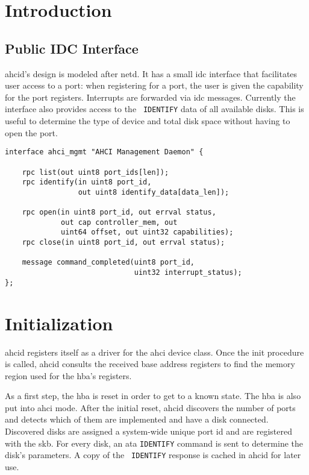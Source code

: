 \label{chap:ahcid}

\section{Introduction}

\subsection{Public IDC Interface}

ahcid's design is modeled after netd. It has a small \acs{idc} interface that
facilitates user access to a port: when registering for a port, the user is
given the capability for the port registers. Interrupts are forwarded via
\acs{idc} messages.  Currently the interface also provides access to the {\tt
IDENTIFY} data of all available disks. This is useful to determine the type of
device and total disk space without having to open the port.

\begin{center}
\begin{minipage}{100mm}
\begin{lstlisting}[label={code:ahci_mgmt.if}, caption={ahci management Flounder
interface}]
interface ahci_mgmt "AHCI Management Daemon" {

    rpc list(out uint8 port_ids[len]);
    rpc identify(in uint8 port_id,
                 out uint8 identify_data[data_len]);

    rpc open(in uint8 port_id, out errval status,
             out cap controller_mem, out
             uint64 offset, out uint32 capabilities);
    rpc close(in uint8 port_id, out errval status);

    message command_completed(uint8 port_id,
                              uint32 interrupt_status);
};
\end{lstlisting}
\end{minipage}
\end{center}

\section{Initialization}

ahcid registers itself as a driver for the \ac{ahci} device class. Once the
init procedure is called, ahcid consults the received base address registers to
find the memory region used for the \acs{hba}'s registers.

As a first step, the \ac{hba} is reset in order to get to a known state. The
\ac{hba} is also put into \ac{ahci} mode. After the initial reset, ahcid
discovers the number of ports and detects which of them are implemented and
have a disk connected.  Discovered disks are assigned a system-wide unique port
id and are registered with the skb. For every disk, an \ac{ata} {\tt IDENTIFY}
command is sent to determine the disk's parameters. A copy of the {\tt
IDENTIFY} response is cached in ahcid for later use.

